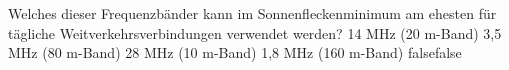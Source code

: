     {Welches dieser Frequenzbänder kann im Sonnenfleckenminimum am ehesten für tägliche Weitverkehrsverbindungen verwendet werden?}
    {14 MHz (20 m-Band)}
    {3,5 MHz (80 m-Band)}
    {28 MHz (10 m-Band)}
    {1,8 MHz (160 m-Band)}
    {false}{false}